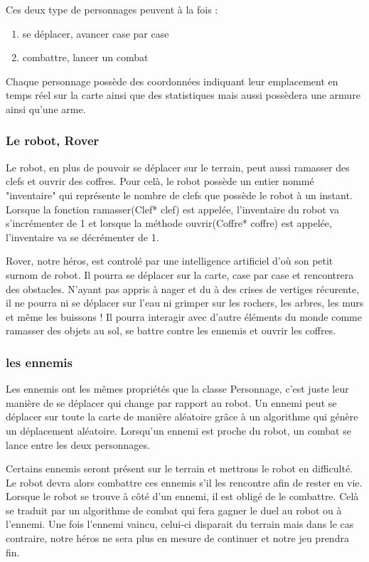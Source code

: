 \documentclass[a4paper 12pts]{article}
\begin{document}
Ces deux type de personnages peuvent à la fois :

\begin{enumerate}
	\item se déplacer, avancer case par case 
	\item combattre, lancer un combat
\end{enumerate}

Chaque personnage possède des coordonnées indiquant leur emplacement en temps réel sur la carte ainsi que des statistiques mais aussi possèdera une armure ainsi qu'une arme.

\subsubsection{Le robot, Rover}


Le robot, en plus de pouvoir se déplacer sur le terrain, peut aussi ramasser des clefs et ouvrir des coffres.
Pour celà, le robot possède un entier nommé "inventaire" qui représente le nombre de clefs que possède le robot à un instant.
Lorsque la fonction ramasser(Clef* clef) est appelée, l'inventaire du robot va s'incrémenter de 1 et lorsque la méthode ouvrir(Coffre* coffre)
est appelée, l'inventaire va se décrémenter de 1.

Rover, notre héros, est controlé par une intelligence artificiel d'où son petit surnom de robot.
Il pourra se déplacer sur la carte, case par case et rencontrera des obstacles. 
N'ayant pas appris à nager et du à des crises de vertiges récurente, il ne pourra ni se déplacer sur l'eau ni grimper sur les rochers,
les arbres, les murs et même les buissons !
Il pourra interagir avec d'autre éléments du monde comme ramasser des objets au sol, se battre contre les ennemis et ouvrir les coffres. 

\subsubsection{les ennemis}

Les ennemis ont les mêmes propriétés que la classe Personnage, c'est juste leur manière de se déplacer qui change par rapport au robot. 
Un ennemi peut se déplacer sur toute la carte de manière aléatoire grâce à un algorithme qui génère un déplacement aléatoire.
Lorsqu'un ennemi est proche du robot, un combat se lance entre les deux personnages.



Certains ennemis seront présent sur le terrain et mettrons le robot en difficulté. 
Le robot devra alors combattre ces ennemis s'il les rencontre afin de rester en vie.
Lorsque le robot se trouve à côté d'un ennemi, il est obligé de le combattre. 
Celà se traduit par un algorithme de combat qui fera gagner le duel au robot ou à l'ennemi. 
Une fois l'ennemi vaincu, celui-ci disparait du terrain mais dans le cas contraire, 
notre héros ne sera plus en mesure de continuer et notre jeu prendra fin.
\end{document}
